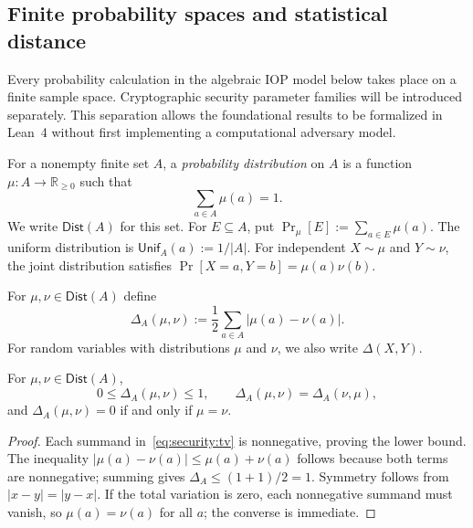 \subsection{Finite probability spaces and statistical distance}\label{sec:security:probability}

Every probability calculation in the algebraic IOP model below takes place on a finite sample space. Cryptographic security parameter families will be introduced separately. This separation allows the foundational results to be formalized in Lean~4 without first implementing a computational adversary model.

\begin{definition}\label{def:security:distribution}
For a nonempty finite set $A$, a \emph{probability distribution} on $A$ is a function $\mu:A\to\mathbb R_{\geq0}$ such that
\[
 \sum_{a\in A}\mu(a)=1.
\]
We write $\mathsf{Dist}(A)$ for this set. For $E\subseteq A$, put $\Pr_\mu[E]:=\sum_{a\in E}\mu(a)$. The uniform distribution is $\mathsf{Unif}_A(a):=1/|A|$. For independent $X\sim\mu$ and $Y\sim\nu$, the joint distribution satisfies $\Pr[X=a,Y=b]=\mu(a)\nu(b)$.
\end{definition}

\begin{definition}\label{def:security:tv}
For $\mu,\nu\in\mathsf{Dist}(A)$ define
\begin{equation}\label{eq:security:tv}
  \Delta_A(\mu,\nu):=\frac12\sum_{a\in A}|\mu(a)-\nu(a)|.
\end{equation}
For random variables with distributions $\mu$ and $\nu$, we also write $\Delta(X,Y)$.
\end{definition}

\begin{lemma}\label{lem:security:tv-range}
For $\mu,\nu\in\mathsf{Dist}(A)$,
\[
 0\leq\Delta_A(\mu,\nu)\leq1,\qquad
 \Delta_A(\mu,\nu)=\Delta_A(\nu,\mu),
\]
and $\Delta_A(\mu,\nu)=0$ if and only if $\mu=\nu$.
\end{lemma}
\begin{proof}
Each summand in~\eqref{eq:security:tv} is nonnegative, proving the lower bound. The inequality $|\mu(a)-\nu(a)|\leq\mu(a)+\nu(a)$ follows because both terms are nonnegative; summing gives $\Delta_A\leq(1+1)/2=1$. Symmetry follows from $|x-y|=|y-x|$. If the total variation is zero, each nonnegative summand must vanish, so $\mu(a)=\nu(a)$ for all $a$; the converse is immediate.
\end{proof}

